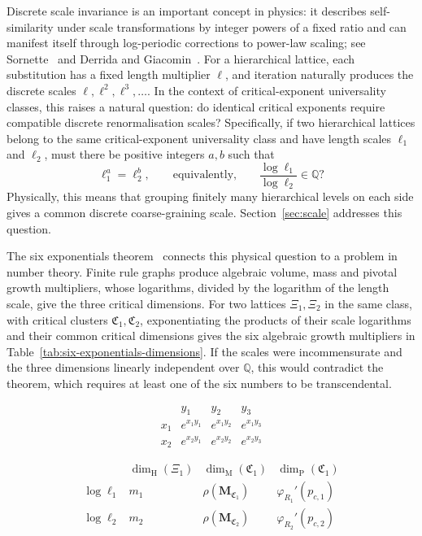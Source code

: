 \documentclass[scheme=plain,11pt]{ctexart}
\theoremstyle{definition}
\theoremstyle{remark}
\newcommand{\dimhaus}{\dim_{\mathrm H}}
\newcommand{\dimmass}{\dim_{\mathrm M}}
\begin{document}
Discrete scale invariance is an important concept in physics: it describes self-similarity under scale transformations by integer powers of a fixed ratio and can manifest itself through log-periodic corrections to power-law scaling; see Sornette~\cite{sornette1998discrete} and Derrida and Giacomin~\cite{derrida2014logperiodic}.
For a hierarchical lattice, each substitution has a fixed length multiplier $\ell$, and iteration naturally produces the discrete scales $\ell,\ell^2,\ell^3,\ldots$.
In the context of critical-exponent universality classes, this raises a natural question: do identical critical exponents require compatible discrete renormalisation scales?
Specifically, if two hierarchical lattices belong to the same critical-exponent universality class and have length scales $\ell_1$ and $\ell_2$, must there be positive integers $a,b$ such that
\[
\ell_1^a=\ell_2^b,
\qquad\text{equivalently,}\qquad
\frac{\log\ell_1}{\log\ell_2}\in\mathbb Q?
\]
Physically, this means that grouping finitely many hierarchical levels on each side gives a common discrete coarse-graining scale.
Section~\ref{sec:scale} addresses this question.

The six exponentials theorem~\cite{dasgupta2021transcendence} connects this physical question to a problem in number theory.
Finite rule graphs produce algebraic volume, mass and pivotal growth multipliers, whose logarithms, divided by the logarithm of the length scale, give the three critical dimensions.
For two lattices $\Xi_1,\Xi_2$ in the same class, with critical clusters $\mathfrak C_1,\mathfrak C_2$, exponentiating the products of their scale logarithms and their common critical dimensions gives the six algebraic growth multipliers in Table~\ref{tab:six-exponentials-dimensions}.
If the scales were incommensurate and the three dimensions linearly independent over $\mathbb Q$, this would contradict the theorem, which requires at least one of the six numbers to be transcendental.

\begin{table}[htbp]
\centering\small
\renewcommand{\arraystretch}{1.35}
\begin{minipage}{0.34\textwidth}
\centering
\[
\begin{array}{c|ccc}
 & y_1&y_2&y_3\\\hline
 x_1&e^{x_1y_1}&e^{x_1y_2}&e^{x_1y_3}\\
 x_2&e^{x_2y_1}&e^{x_2y_2}&e^{x_2y_3}
\end{array}
\]
\end{minipage}\hfill
\begin{minipage}{0.63\textwidth}
\centering
\[
\begin{array}{c|ccc}
 &\dimhaus(\Xi_1)&\dimmass(\mathfrak C_1)&\dim_{\mathrm P}(\mathfrak C_1)\\\hline
 \log\ell_1&m_1&\rho(\mathbf M_{\mathfrak C_1})&\varphi_{R_1}'(p_{c,1})\\
 \log\ell_2&m_2&\rho(\mathbf M_{\mathfrak C_2})&\varphi_{R_2}'(p_{c,2})
\end{array}
\]
\end{minipage}
\caption{Six exponentials and percolation exponents.}
\label{tab:six-exponentials-dimensions}
\end{table}
\end{document}
